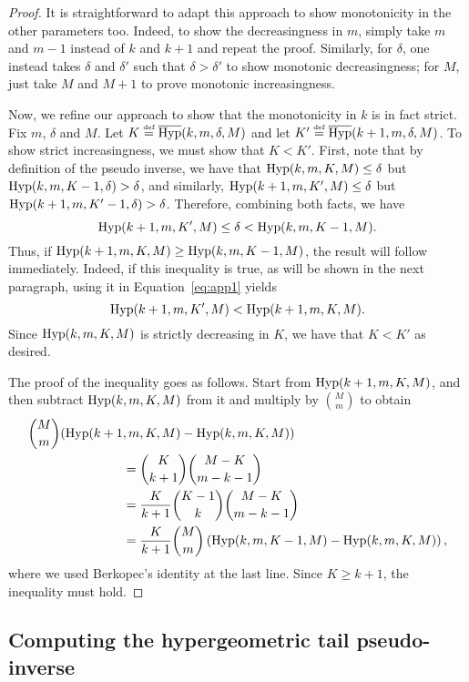 \documentclass[twoside,11pt]{article}
\newcommand{\pr}[1]{\left(#1\right)}
\newcommand{\eqdef}{\overset{\smash{\mbox{\tiny \rm def}}}{=}}
\newcommand{\Hyp}{\textnormal{Hyp}}
\newcommand{\HypInv}{\overline{\textnormal{Hyp}}}
\begin{document}
\begin{proof}
It is straightforward to adapt this approach to show monotonicity in the other parameters too.
Indeed, to show the decreasingness in $m$, simply take $m$ and $m-1$ instead of $k$ and $k+1$ and repeat the proof.
Similarly, for $\delta$, one instead takes $\delta$ and $\delta'$ such that $\delta > \delta'$ to show monotonic decreasingness; for $M$, just take $M$ and $M+1$ to prove monotonic increasingness.

Now, we refine our approach to show that the monotonicity in $k$ is in fact strict.
Fix $m$, $\delta$ and $M$.
Let $K \eqdef \HypInv(k,m,\delta,M)$ and let $K'\eqdef \HypInv(k+1,m,\delta,M)$.
To show strict increasingness, we must show that $K < K'$.
First, note that by definition of the pseudo inverse, we have that $\Hyp(k,m,K,M)\le\delta$ but $\Hyp(k,m,K-1,\delta) > \delta$, and similarly, $\Hyp(k+1,m,K',M) \le \delta$ but $\Hyp(k+1,m,K'-1,\delta) > \delta$.
Therefore, combining both facts, we have
\begin{equation}\label{eq:app1}
    \Hyp(k+1,m,K',M) \le \delta < \Hyp(k,m,K-1,M).
\end{equation}
Thus, if $\Hyp(k+1,m,K,M) \ge \Hyp(k,m,K-1,M)$, the result will follow immediately.
Indeed, if this inequality is true, as will be shown in the next paragraph, using it in Equation~\eqref{eq:app1} yields
\begin{equation*}
    \Hyp(k+1,m,K',M) < \Hyp(k+1,m,K,M).
\end{equation*}
Since $\Hyp(k,m,K,M)$ is strictly decreasing in $K$, we have that $K < K'$ as desired.

The proof of the inequality goes as follows.
Start from $\Hyp(k+1,m,K,M)$, and then subtract $\Hyp(k,m,K,M)$ from it and multiply by $\binom{M}{m}$ to obtain
\begin{align*}
    \binom{M}{m} (\Hyp(k+1&, m,K,M) - \Hyp(k,m,K,M))\\
    &= \binom{K}{k+1} \binom{M-K}{m-k-1}\\
    &= \frac{K}{k+1} \binom{K-1}{k} \binom{M-K}{m-k-1}\\
    &= \frac{K}{k+1} \binom{M}{m}\pr{ \Hyp(k,m,K-1,M) - \Hyp(k,m,K,M) },
\end{align*}
where we used Berkopec's identity at the last line.
Since $K \geq k+1$, the inequality must hold.
\end{proof}


\subsection{Computing the hypergeometric tail pseudo-inverse}
\label{app:computing_HypInv}
\end{document}
